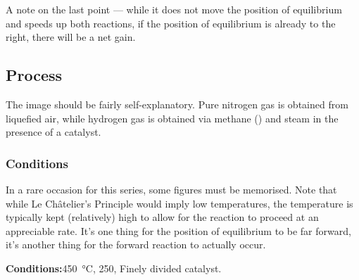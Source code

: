 			A note on the last point --- while it does not move the position of equilibrium and speeds up both reactions, if the
			position of equilibrium is already to the right, there will be a net gain.



		\pagebreak
		\subsection{Process}



			The image should be fairly self-explanatory. Pure nitrogen gas is obtained from liquefied air, while hydrogen gas is obtained
			via methane () and steam in the presence of a catalyst.

			\subsubsection{Conditions}

				In a rare occasion for this series, some figures must be memorised. Note that while Le Châtelier's Principle would imply
				low temperatures, the temperature is typically kept (relatively) high to allow for the reaction to proceed at an appreciable
				rate. It's one thing for the position of equilibrium to be far forward, it's another thing for the forward reaction to
				actually occur.

				\vspace{1.5em}
				\vbox{\textbf{Conditions:}\tabto{35mm}\SI{450}{\celsius}, \SI{250}{\atm}, Finely divided  catalyst.}




















